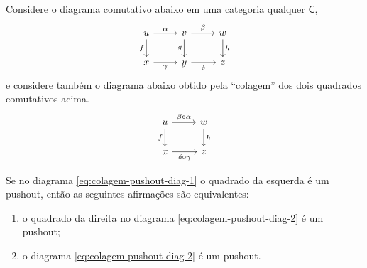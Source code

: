  \begin{teo}
   Considere o diagrama comutativo abaixo em uma categoria qualquer $\mathsf{C}$,
   \begin{equation}\label{eq:colagem-pushout-diag-1}
     \begin{tikzcd}
       u
       \arrow[r, "\alpha"]
       \arrow[d, "f" swap]
       & v
       \arrow[r, "\beta"]
       \arrow[d, "g" swap]
       & w
       \arrow[d, "h"]
       \\ x
       \arrow[r, "\gamma" swap]
       & y
       \arrow[r, "\delta" swap]
       & z
     \end{tikzcd}
   \end{equation}
   e considere também o diagrama abaixo obtido pela ``colagem'' dos dois quadrados comutativos acima.
   \begin{equation}\label{eq:colagem-pushout-diag-2}
     \begin{tikzcd}
       u
       \arrow[r, "\beta \circ \alpha"]
       \arrow[d, "f" swap]
       & w
       \arrow[d, "h"]
       \\ x
       \arrow[r, "\delta \circ \gamma" swap]
       & z
     \end{tikzcd}
   \end{equation}

   Se no diagrama \eqref{eq:colagem-pushout-diag-1} o quadrado da esquerda é um pushout, então as seguintes afirmações são equivalentes:
   \begin{enumerate}
   \item o quadrado da direita no diagrama \eqref{eq:colagem-pushout-diag-2} é um pushout;
   \item o diagrama \eqref{eq:colagem-pushout-diag-2} é um pushout.
   \end{enumerate}
 \end{teo}

